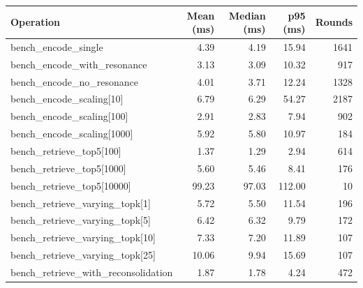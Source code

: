 \begin{tabular}{lrrrr}
\toprule
\textbf{Operation} & \textbf{Mean (ms)} & \textbf{Median (ms)} & \textbf{p95 (ms)} & \textbf{Rounds} \\
\midrule
bench\_encode\_single & 4.39 & 4.19 & 15.94 & 1641 \\
bench\_encode\_with\_resonance & 3.13 & 3.09 & 10.32 & 917 \\
bench\_encode\_no\_resonance & 4.01 & 3.71 & 12.24 & 1328 \\
bench\_encode\_scaling[10] & 6.79 & 6.29 & 54.27 & 2187 \\
bench\_encode\_scaling[100] & 2.91 & 2.83 & 7.94 & 902 \\
bench\_encode\_scaling[1000] & 5.92 & 5.80 & 10.97 & 184 \\
bench\_retrieve\_top5[100] & 1.37 & 1.29 & 2.94 & 614 \\
bench\_retrieve\_top5[1000] & 5.60 & 5.46 & 8.41 & 176 \\
bench\_retrieve\_top5[10000] & 99.23 & 97.03 & 112.00 & 10 \\
bench\_retrieve\_varying\_topk[1] & 5.72 & 5.50 & 11.54 & 196 \\
bench\_retrieve\_varying\_topk[5] & 6.42 & 6.32 & 9.79 & 172 \\
bench\_retrieve\_varying\_topk[10] & 7.33 & 7.20 & 11.89 & 107 \\
bench\_retrieve\_varying\_topk[25] & 10.06 & 9.94 & 15.69 & 107 \\
bench\_retrieve\_with\_reconsolidation & 1.87 & 1.78 & 4.24 & 472 \\
\bottomrule
\end{tabular}

